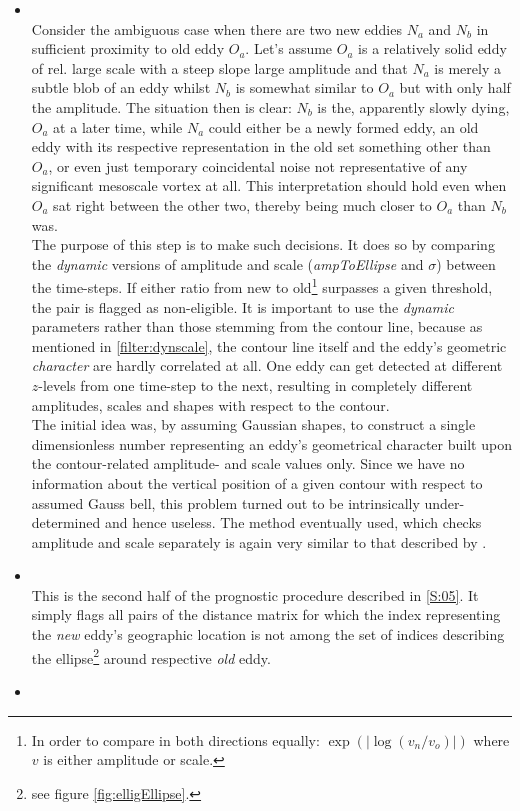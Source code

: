 \begin{itemize}
\label{item:checkDynamicIdentity}
	\item
	 \\
	 Consider the ambiguous case when there are two new eddies $N_a$ and $N_b$ in sufficient proximity to old eddy $O_a$. Let's assume $O_a$ is a relatively solid eddy of rel. large scale with a steep slope \ie large amplitude and that $N_a$ is merely a subtle blob of an eddy whilst $N_b$ is somewhat similar to $O_a$ but with only half the amplitude. The situation then is clear: $N_b$ is the, apparently slowly dying, $O_a$ at a later time, while $N_a$ could either be a newly formed eddy, an old eddy with its respective representation in the old set something other than $O_a$, or even just temporary coincidental noise not representative of any significant mesoscale vortex at all. This interpretation should hold even when $O_a$ sat right between the other two, thereby being much closer to $O_a$ than $N_b$ was.\\
	 The purpose of this step is to make such decisions. It does so by comparing the \textit{dynamic} versions of amplitude and scale (\textit{ampToEllipse} and $\sigma$) between the time-steps. If either ratio from new to old\footnote{In order to compare in both directions equally: $\exp{(\left|\log{(v_n/v_o)}\right|)}$ where $v$ is either amplitude or scale.} surpasses a given threshold, the pair is flagged as non-eligible. It is important to use the \textit{dynamic} parameters rather than those stemming from the contour line, because as mentioned  in \cref{filter:dynscale}, the contour line itself and the eddy's  geometric \textit{character} are hardly correlated at all. One eddy can get detected at different $z$-levels from one time-step to the next, resulting in completely different amplitudes, scales and shapes with respect to the contour.\\
	The initial idea was, by assuming Gaussian shapes, to construct a single dimensionless number representing an eddy's geometrical character built upon the contour-related amplitude- and scale values only. Since we have no information about the vertical position of a given contour with respect to assumed Gauss bell, this problem turned out to be intrinsically under-determined and hence useless. The method eventually used, which checks amplitude and scale separately is again very similar to that described by \citeauthor{Chelton2011}.
	  \item
 \\
This is the second half of the prognostic procedure described in \cref{S:05}. It simply flags all pairs of the distance matrix for which the index representing the \textit{new} eddy's geographic location is not among the set of indices describing the ellipse\footnote{see figure \cref{fig:elligEllipse}.} around respective \textit{old} eddy.
 \item
\end{itemize}
